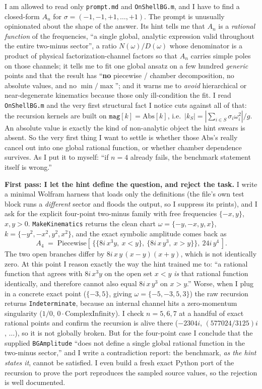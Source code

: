 \documentclass{article}
\begin{document}
I am allowed to read only \texttt{prompt.md} and \texttt{OnShellBG.m}, and I have
to find a closed-form $A_n$ for $\sigma=(-1,-1,+1,\dots,+1)$. The prompt is
unusually opinionated about the shape of the answer. Its hint tells me that
$A_n$ is a \emph{rational function} of the frequencies, ``a single global,
analytic expression valid throughout the entire two-minus sector'', a ratio
$N(\omega)/D(\omega)$ whose denominator is a product of physical
factorization-channel factors so that $A_n$ carries simple poles on those
channels; it tells me to fit one global ansatz on a few hundred \emph{generic}
points and that the result has ``\textbf{no} piecewise / chamber decomposition,
no absolute values, and no $\min/\max$''; and it warns me to \emph{avoid}
hierarchical or near-degenerate kinematics because those only ill-condition the
fit. I read \texttt{OnShellBG.m} and the very first structural fact I notice cuts
against all of that: the recursion kernels are built on $\texttt{mag}[k]=
\mathrm{Abs}[k]$, i.e.\ $|k_S|=|\sum_{i\in S}\sigma_i\omega_i^2|/g$. An absolute
value is exactly the kind of non-analytic object the hint swears is absent. So
the very first thing I want to settle is whether those $\mathrm{Abs}$'s really
cancel out into one global rational function, or whether chamber dependence
survives. As I put it to myself: ``if $n=4$ already fails, the benchmark
statement itself is wrong.''

\medskip
\noindent\textbf{First pass: I let the hint define the question, and reject the
task.}\quad
I write a minimal Wolfram harness that loads only the definitions (the file's own
test block runs a \emph{different} sector and floods the output, so I suppress
its prints), and I ask for the explicit four-point two-minus family with free
frequencies $\{-x,y\}$, $x,y>0$. \texttt{MakeKinematics} returns the clean chart
$\omega=\{-y,-x,y,x\}$, $k=\{-y^2,-x^2,y^2,x^2\}$, and the exact symbolic
amplitude comes back as
\[
A_4 \;=\;
\mathrm{Piecewise}\!\left[\,\{\{8 i\,x^{3}y,\ x<y\},\ \{8 i\,x\,y^{3},\ x>y\}\},\
24 i\,y^{4}\,\right].
\]
The two open branches differ by $8 i\,x\,y\,(x-y)(x+y)$, which is not identically
zero. At this point I reason exactly the way the hint trained me to: ``a rational
function that agrees with $8 i\,x^{3}y$ on the open set $x<y$ \emph{is} that
rational function identically, and therefore cannot also equal $8 i\,x\,y^{3}$ on
$x>y$.'' Worse, when I plug in a concrete exact point ($\{-3,5\}$, giving
$\omega=\{-5,-3,5,3\}$) the raw recursion returns \texttt{Indeterminate}, because
an internal channel hits a zero-momentum singularity ($1/0$,
$0\cdot\mathrm{ComplexInfinity}$). I check $n=5,6,7$ at a handful of exact
rational points and confirm the recursion is alive there ($-2304i$,
$(577024/3125)i$, $\dots$), so it is not globally broken. But for the four-point
case I conclude that the supplied \texttt{BGAmplitude} ``does not define a single
global rational function in the two-minus sector,'' and I write a contradiction
report: the benchmark, \emph{as the hint states it}, cannot be satisfied. I even
build a fresh exact Python port of the recursion to prove the port reproduces the
sampled source values, so the rejection is well documented.
\end{document}
